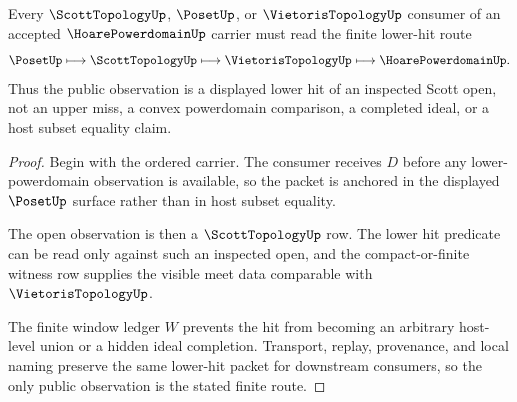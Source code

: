 \begin{theorem}
\label{thm:hoare-powerdomain-lower-hit-window}
Every $\ScottTopologyUp$, $\PosetUp$, or $\VietorisTopologyUp$ consumer of an accepted $\HoarePowerdomainUp$ carrier must read the finite lower-hit route
$$
\PosetUp
\longmapsto
\ScottTopologyUp
\longmapsto
\VietorisTopologyUp
\longmapsto
\HoarePowerdomainUp .
$$
Thus the public observation is a displayed lower hit of an inspected Scott open, not an upper miss, a convex powerdomain comparison, a completed ideal, or a host subset equality claim.
\end{theorem}
\begin{proof}
Begin with the ordered carrier. The consumer receives $D$ before any lower-powerdomain observation is available, so the packet is anchored in the displayed $\PosetUp$ surface rather than in host subset equality.

The open observation is then a $\ScottTopologyUp$ row. The lower hit predicate can be read only against such an inspected open, and the compact-or-finite witness row supplies the visible meet data comparable with $\VietorisTopologyUp$.

The finite window ledger $W$ prevents the hit from becoming an arbitrary host-level union or a hidden ideal completion. Transport, replay, provenance, and local naming preserve the same lower-hit packet for downstream consumers, so the only public observation is the stated finite route.
\end{proof}




